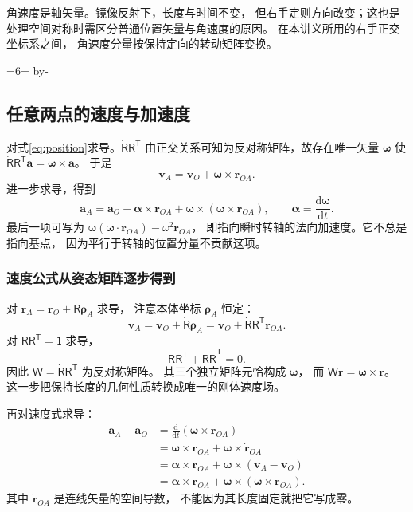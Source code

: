 \documentclass[UTF8,zihao=-4,fontset=fandol,a4paper]{ctexart}
\makeatletter
\newcommand{\vect}[1]{\bm{#1}}
\newcommand{\dd}{\mathrm d}
\newcommand{\Needspace}[1]{\par\if@nobreak\else\penalty0\begingroup\dimen0=#1\relax\dimen2=\pagegoal\advance\dimen2 by-\pagetotal\ifdim\dimen0>\dimen2\newpage\fi\endgroup\fi}
\let\SavedSubsection\subsection
\renewcommand{\subsection}{\Needspace{6\baselineskip}\SavedSubsection}
\makeatother
\begin{document}
角速度是轴矢量。镜像反射下，长度与时间不变，
但右手定则方向改变；这也是处理空间对称时需区分普通位置矢量与角速度的原因。
在本讲义所用的右手正交坐标系之间，
角速度分量按保持定向的转动矩阵变换。


\subsection{任意两点的速度与加速度}\label{sub:c3-2.2}
对式\eqref{eq:position}求导。$\dot{\mathsf R}\mathsf R^{\mathsf T}$
由正交关系可知为反对称矩阵，故存在唯一矢量 $\vect\omega$ 使
$\dot{\mathsf R}\mathsf R^{\mathsf T}\vect a=\vect\omega\times\vect a$。
于是
\begin{equation}\label{eq:velocity}
\vect v_A=\vect v_O+\vect\omega\times\vect r_{OA}.
\end{equation}
进一步求导，得到
\begin{equation}\label{eq:acceleration}
\vect a_A=\vect a_O+\vect\alpha\times\vect r_{OA}
+\vect\omega\times(\vect\omega\times\vect r_{OA}),\qquad
\vect\alpha=\frac{\dd\vect\omega}{\dd t}.
\end{equation}
最后一项可写为
$\vect\omega(\vect\omega\cdot\vect r_{OA})-\omega^2\vect r_{OA}$，
即指向瞬时转轴的法向加速度。它不总是指向基点，
因为平行于转轴的位置分量不贡献这项。


\subsubsection*{速度公式从姿态矩阵逐步得到}
对 $\vect r_A=\vect r_O+\mathsf R\vect\rho_A$ 求导，
注意本体坐标 $\vect\rho_A$ 恒定：
\[
\vect v_A=\vect v_O+\dot{\mathsf R}\vect\rho_A
=\vect v_O+\dot{\mathsf R}\mathsf R^{\mathsf T}\vect r_{OA}.
\]
对 $\mathsf R\mathsf R^{\mathsf T}=\mathsf1$ 求导，
\[
\dot{\mathsf R}\mathsf R^{\mathsf T}
+\mathsf R\dot{\mathsf R}^{\mathsf T}=0.
\]
因此 $\mathsf W=\dot{\mathsf R}\mathsf R^{\mathsf T}$ 为反对称矩阵。
其三个独立矩阵元恰构成 $\vect\omega$，
而 $\mathsf W\vect r=\vect\omega\times\vect r$。
这一步把保持长度的几何性质转换成唯一的刚体速度场。

再对速度式求导：
\begin{align*}
\vect a_A-\vect a_O
&=\frac{\dd}{\dd t}(\vect\omega\times\vect r_{OA})\\
&=\dot{\vect\omega}\times\vect r_{OA}
+\vect\omega\times\dot{\vect r}_{OA}\\
&=\vect\alpha\times\vect r_{OA}
+\vect\omega\times(\vect v_A-\vect v_O)\\
&=\vect\alpha\times\vect r_{OA}
+\vect\omega\times(\vect\omega\times\vect r_{OA}).
\end{align*}
其中 $\dot{\vect r}_{OA}$ 是连线矢量的空间导数，
不能因为其长度固定就把它写成零。
\end{document}
